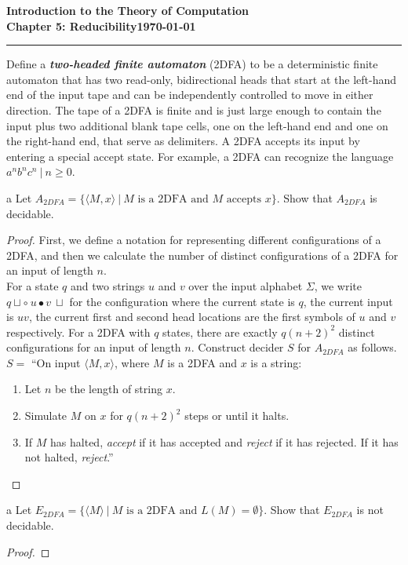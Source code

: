 \documentclass[11pt]{article}
\newcommand{\dated}{\today}
\begin{document}
\textbf{Introduction to the Theory of
Computation}\hfill\textbf{\myname}\\[0.01in]
\textbf{Chapter 5: Reducibility}\hfill\textbf{\dated}\\
\smallskip\hrule\bigskip

\begin{problem}{5.26}
Define a \textbf{\textit{two-headed finite automaton}} (2DFA) to be a deterministic finite automaton that has two read-only, bidirectional heads that start at the left-hand end of the input tape and can be independently controlled to move in either direction. The tape of a 2DFA is finite and is just large enough to contain the input plus two additional blank tape cells, one on the left-hand end and one on the right-hand end, that serve as delimiters. A 2DFA accepts its input by entering a special accept state. For example, a 2DFA can recognize the language ${a^nb^nc^n \ | \ n \geq 0}$.
\end{problem}

\begin{problem}[Part]{a}
Let $A_{2DFA} = \{\langle M, x \rangle \ | \ M \text{ is a 2DFA and } M \text{ accepts } x\}$. Show that $A_{2DFA}$ is decidable.
\end{problem}

\begin{proof}
First, we define a notation for representing different configurations of a 2DFA, and then we calculate the number of distinct configurations of a 2DFA for an input of length $n$. \\

For a state $q$ and two strings $u$ and $v$ over the input alphabet $\Sigma$, we write $q \sqcup \circ \ u \bullet v \ \sqcup$ for the configuration  where the current state is $q$, the current input is $uv$, the current first and second head locations are the first symbols of $u$ and $v$ respectively. For a 2DFA with $q$ states, there are exactly $q(n + 2)^2$ distinct configurations for an input of length $n$. Construct decider $S$ for $A_{2DFA}$ as follows. \\

$S =$ \textquotedblleft On input $\langle M, x \rangle$, where $M$ is a 2DFA and $x$ is a string:
\begin{enumerate}
\item Let $n$ be the length of string $x$.
\item Simulate $M$ on $x$ for $q(n + 2)^2$ steps or until it halts.
\item If $M$ has halted, \textit{accept} if it has accepted and \textit{reject} if it has rejected. If it has not halted, \textit{reject}.\textquotedblright
\end{enumerate}
\end{proof}

\begin{problem}[Part]{a}
Let $E_{2DFA} = \{\langle M \rangle \ | \ M \text{ is a 2DFA and } L(M) = \emptyset   \}$. Show that $E_{2DFA}$ is not decidable.
\end{problem}

\begin{proof}
\end{proof}
\end{document}
